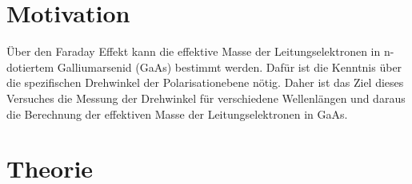 \section{Motivation}
\label{sec:Motivation}
Über den Faraday Effekt kann die effektive Masse der Leitungselektronen
in n-dotiertem Galliumarsenid (GaAs) bestimmt werden. Dafür ist die
Kenntnis über die spezifischen Drehwinkel der Polarisationebene nötig.
Daher ist das Ziel dieses Versuches die Messung der Drehwinkel für
verschiedene Wellenlängen und daraus die Berechnung der effektiven Masse
der
Leitungselektronen in GaAs.

\section{Theorie}
\label{sec:Theorie}

